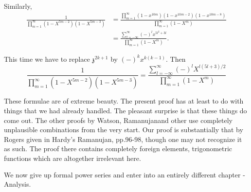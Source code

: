 Similarly,
\begin{align*}
  \frac{1}{\prod\limits^\infty_{m=1} (1-X^{5m-2})(1-X^{5m-3})} & =
  \frac{\prod\limits^\infty_{m=1}(1-x^{10m})
    (1-x^{10m-2})(1-x^{10m-8})}{\prod\limits^\infty_{m=1} (1-X^m)}\\
    & = \frac{\sum\limits^\infty_{l=-\infty}(-)^l
      x^{5l^2+3l}}{\prod\limits^\infty_{m=1}(1-X^m)}. 
\end{align*}

This time we have to replace $\mathfrak{z}^{2k+1}$ by
$(-)^{k}x^{k(k-1)}$. Then
$$
  \frac{1}{\prod\limits^\infty_{m=1} (1-X^{5m-2})(1-X^{5m-3})} =
  \frac{\sum\limits^\infty_{l=-\infty}(-)^l X^{l(5l+3)/2}}
    {\prod\limits^\infty_{m=1} (1-X^m)}
$$

These formulae are of extreme beauty. The present proof has at least
to do with things that we had already handled. The pleasant surprise
is that these things do come out. The other proofs by Watson,
Ramanujan\pageoriginale and other use completely unplausible
combinations from the very start. Our proof is substantially that by
Rogers given in Hardy's Ramanujan, pp.96-98, though one may not
recognize it as such. The proof there contains completely foreign
elements, trigonometric functions which are altogether irrelevant
here.

We now give up formal power series and enter into an entirely
different chapter - Analysis.
